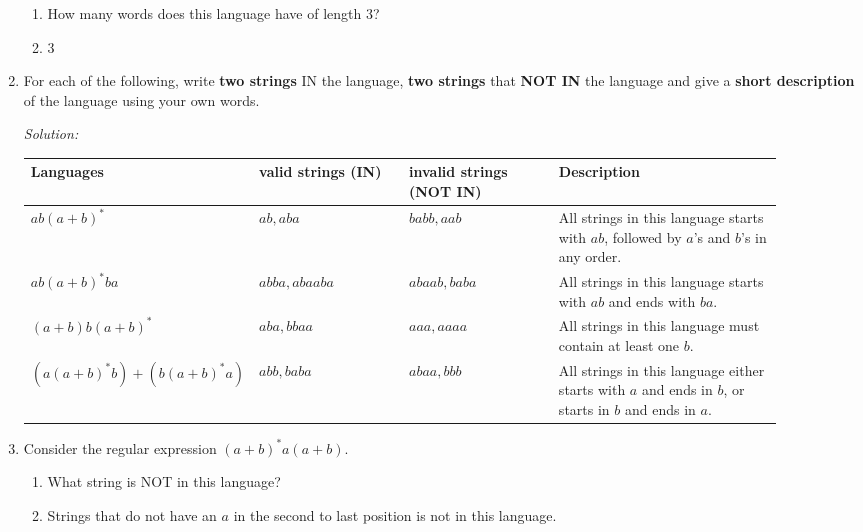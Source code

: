 \documentclass[12pt]{article}
\makeatletter
\renewenvironment{proof}[1][\proofname]{\par
  \normalfont \topsep6\p@\@plus6\p@\relax
  \trivlist
  \item[\hskip\labelsep
        \itshape
    #1\@addpunct{.}]\ignorespaces
}{%
  \endtrivlist\@endpefalse
}
\renewcommand{\proofname}{Solution:}
\makeatother
\begin{document}
\begin{enumerate}
\begin{enumerate}
        \item How many words does this language have of length 3? 
        \begin{proof}
            3
        \end{proof}
        
    \end{enumerate}

        \newpage
    
    \item For each of the following, write \textbf{two strings} IN the language, \textbf{two strings} that \textbf{NOT IN} the language and give a \textbf{short description} of the language using your own words.

    \textit{Solution:}
    
    \begin{table}[h!]
        \centering
        \begin{tabular}{|>{\centering\arraybackslash}p{0.2\linewidth}|>{\centering\arraybackslash}p{0.2\linewidth}|>{\centering\arraybackslash}p{0.2\linewidth}|>{\centering\arraybackslash}p{0.3\linewidth}|} \hline 
            Languages&  2 valid strings (IN)&  2 invalid strings (NOT IN)& Description\\ \hline 
            $ab(a+b)^*$&  $ab, aba$&  $babb, aab$& All strings in this language starts with $ab$, followed by $a$'s and $b$'s in any order.\\ \hline 
            $ab(a+b)^*ba$&  $abba, abaaba$&  $abaab, baba$& All strings in this language starts with $ab$ and ends with $ba$.\\ \hline 
            $(a+b)b(a+b)^*$&  $aba, bbaa$&  $aaa, aaaa$& All strings in this language must contain at least one $b$.\\ \hline
 $(a(a+b)^*b)+(b(a+b)^*a)$& $abb, baba$& $abaa, bbb$&All strings in this language either starts with $a$ and ends in $b$, or starts in $b$ and ends in $a$.\\\hline
        \end{tabular}
        \label{tab:q4}
    \end{table}

    \item Consider the regular expression $(a+b)^*a(a+b)$.
    \begin{enumerate}
        \item What string is NOT in this language?
        \begin{proof}
            Strings that do not have an $a$ in the second to last position is not in this language. 
        \end{proof}


\end{enumerate}
\end{enumerate}
\end{document}
